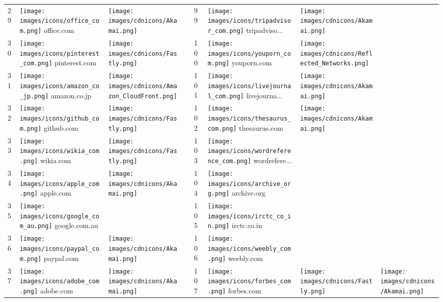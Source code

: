 \begin{table}[tbp]
\begin{tabular}{|llll|llll|}
29 & \texttt{[image: images/icons/office\_com.png]} office.com & \texttt{[image: images/cdnicons/Akamai.png]} & & 99 & \texttt{[image: images/icons/tripadvisor\_com.png]} tripadviso... & \texttt{[image: images/cdnicons/Akamai.png]} & \\
30 & \texttt{[image: images/icons/pinterest\_com.png]} pinterest.com & \texttt{[image: images/cdnicons/Fastly.png]} & & 100 & \texttt{[image: images/icons/youporn\_com.png]} youporn.com & \texttt{[image: images/cdnicons/Reflected\_Networks.png]} & \\
31 & \texttt{[image: images/icons/amazon\_co\_jp.png]} amazon.co.jp & \texttt{[image: images/cdnicons/Amazon\_CloudFront.png]} & & 101 & \texttt{[image: images/icons/livejournal\_com.png]} livejourna... & \texttt{[image: images/cdnicons/Akamai.png]} & \\
32 & \texttt{[image: images/icons/github\_com.png]} github.com & \texttt{[image: images/cdnicons/Fastly.png]} & & 102 & \texttt{[image: images/icons/thesaurus\_com.png]} thesaurus.com & \texttt{[image: images/cdnicons/Akamai.png]} & \\
33 & \texttt{[image: images/icons/wikia\_com.png]} wikia.com & \texttt{[image: images/cdnicons/Fastly.png]} & & 103 & \texttt{[image: images/icons/wordreference\_com.png]} wordrefere... & & \\
34 & \texttt{[image: images/icons/apple\_com.png]} apple.com & \texttt{[image: images/cdnicons/Akamai.png]} & & 104 & \texttt{[image: images/icons/archive\_org.png]} archive.org & & \\
35 & \texttt{[image: images/icons/google\_com\_au.png]} google.com.au & & & 105 & \texttt{[image: images/icons/irctc\_co\_in.png]} irctc.co.in & & \\
36 & \texttt{[image: images/icons/paypal\_com.png]} paypal.com & \texttt{[image: images/cdnicons/Akamai.png]} & & 106 & \texttt{[image: images/icons/weebly\_com.png]} weebly.com & & \\
37 & \texttt{[image: images/icons/adobe\_com.png]} adobe.com & \texttt{[image: images/cdnicons/Akamai.png]} & & 107 & \texttt{[image: images/icons/forbes\_com.png]} forbes.com & \texttt{[image: images/cdnicons/Fastly.png]} & \texttt{[image: images/cdnicons/Akamai.png]} \\

\end{tabular}
\end{table}
